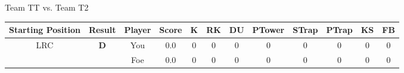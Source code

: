 \documentclass[a4paper,12pt]{article}
\begin{document}
\begin{tabular}[t]{| c | c | c | c | c | c | c | c | c | c | c | c
      |}
                      
      
                      
                        \hline
                      \end{tabular}
                      
  \vspace*{2em}
  \par {\large {\color{Gray} Team} TT {\color{Gray}
      vs. Team} T2}
  \newline
  \begin{tabular}[t]{| c | c | c | c | c | c | c | c | c | c | c | c
      |}
    \hline
    Starting Position & \textbf{Result} & Player & \textbf{Score} & K & RK & DU & PTower & STrap & PTrap & KS & FB \\
    
      
                      
      
                      
      
                      
      
                      
      
        \hline
        \multirow{2}{*}{  LRC
             } &
              \multirow{2}{*}{  
                  \textbf{D}  } & 
                    \cellcolor{yellow!25} You & \cellcolor{yellow!25} 0.0 & \cellcolor{yellow!25} 0 &
                    \cellcolor{yellow!25} 0 & \cellcolor{yellow!25} 0 & \cellcolor{yellow!25} 0 &
                    \cellcolor{yellow!25} 0 & \cellcolor{yellow!25} 0 & \cellcolor{yellow!25} 0 &
                    \cellcolor{yellow!25} 0 \\
                    \cline{3-12}
                    & & \cellcolor{red!15} Foe & \cellcolor{red!15} 0.0 & \cellcolor{red!15} 0 & \cellcolor{red!15}
                    0 & \cellcolor{red!15} 0
                    & \cellcolor{red!15} 0 & \cellcolor{red!15}
                    0 & \cellcolor{red!15} 0 
                    & \cellcolor{red!15} 0 & \cellcolor{red!15}
                    0 \\
                    
                      
      
                      
      
                      
      
                      
      
                      
      

\end{tabular}
\end{document}
